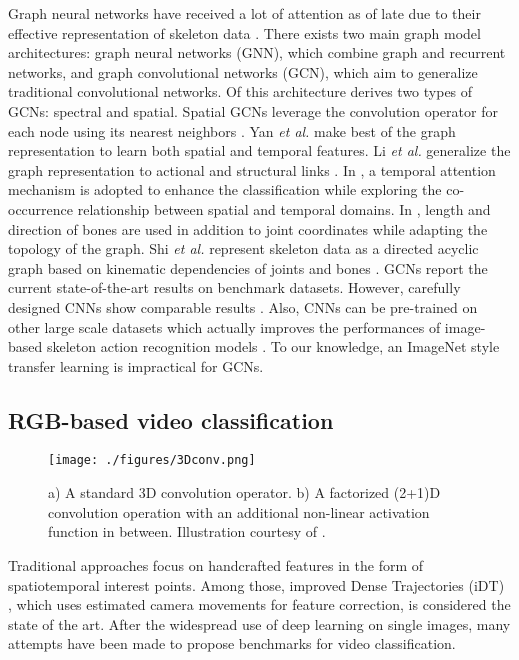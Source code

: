 \documentclass[letterpaper, 10 pt, conference]{ieeeconf}
\begin{document}
Graph neural networks have received a lot of attention as of late due to their effective representation of skeleton data \cite{xu2018powerful}. There exists two main graph model architectures: graph neural networks (GNN), which combine graph and recurrent networks, and graph convolutional networks (GCN), which aim to generalize traditional convolutional networks. Of this architecture derives two types of GCNs: spectral and spatial. Spatial GCNs leverage the convolution operator for each node using its nearest neighbors \cite{simonovsky2017dynamic}. Yan \textit{et al.} \cite{yan2018spatial} make best of the graph representation to learn both spatial and temporal features. Li \textit{et al.} generalize the graph representation to actional and structural links \cite{li2019actional}. In \cite{si2019attention}, a temporal attention mechanism is adopted to enhance the classification while exploring the co-occurrence relationship between spatial and temporal domains. In \cite{shi2019two}, length and direction of bones are used in addition to joint coordinates while adapting the topology of the graph. Shi \textit{et al.} represent skeleton data as a directed acyclic graph based on kinematic dependencies of joints and bones \cite{shi2019skeleton}. GCNs report the current state-of-the-art results on benchmark datasets. However, carefully designed CNNs show comparable results \cite{zhang2019view}. Also, CNNs can be pre-trained on other large scale datasets which actually improves the performances of image-based skeleton action recognition models \cite{zhang2019view}. To our knowledge, an ImageNet \cite{deng2009imagenet} style transfer learning is impractical for GCNs.  

\subsection{RGB-based video classification} \label{review_rgb_methods}

\begin{figure}[t]
  \centering
  \texttt{[image: ./figures/3Dconv.png]}
  \caption{a) A standard 3D convolution operator. b) A factorized (2+1)D convolution operation with an additional non-linear activation function in between. Illustration courtesy of \cite{tran2018closer}.}
  \label{3Dconv}
\end{figure}

Traditional approaches focus on handcrafted features in the form of spatiotemporal interest points. Among those, improved Dense Trajectories (iDT) \cite{wang2013action}, which uses estimated camera movements for feature correction, is considered the state of the art. After the widespread use of deep learning on single images, many attempts have been made to propose benchmarks for video classification.
\end{document}
